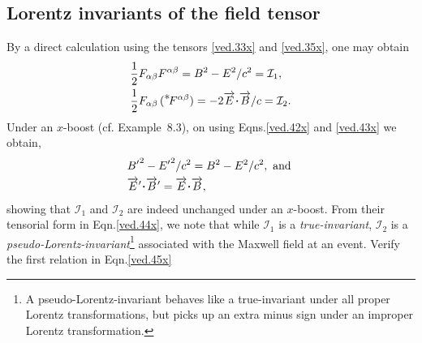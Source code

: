 \subsection{Lorentz invariants of the field tensor}
By a direct calculation using the tensors \eqref{ved.33x} 
and \eqref{ved.35x}, one may obtain
\begin{align}\label{ved.44x}
&\frac{1}{2}F_{\gka\gkb}F^{\gka\gkb}= B^2 - E^2/c^2
=\mathcal{I}_1, \notag\\
&\frac{1}{2}F_{\gka\gkb}\,(\dual{F}^{\gka\gkb})
=-2\vec{E}\dotp\vec{B}/c=\mathcal{I}_2.
\end{align}
Under an $x$-boost (cf. Example~8.3),  on using
Eqns.\eqref{ved.42x} and \eqref{ved.43x}  we obtain,
\begin{align}\label{ved.45x}
&\pB^2-\pE^2 /c^2 = B^2 -E^2/c^2,\text{ and }\notag\\&
 \vec{E}'\dotp\vec{B}' =\vec{E}\dotp\vec{B},
\end{align}
showing that $\mathcal{I}_1$ and $\mathcal{I}_2$ are indeed 
unchanged under an  $x$-boost. From their tensorial form 
in Eqn.\eqref{ved.44x}, we note that while $\mathcal{I}_1$ 
is a \textsl{true-invariant},  $\mathcal{I}_2$ is a 
\textsl{pseudo-Lorentz-invariant}\footnote{A 
pseudo-Lorentz-invariant behaves like a true-invariant 
under all proper Lorentz transformations, but picks up 
an extra minus sign under an improper Lorentz 
transformation.} associated with the Maxwell field at 
an event. \exm Verify the first relation in 
Eqn.\eqref{ved.45x}
\soln
